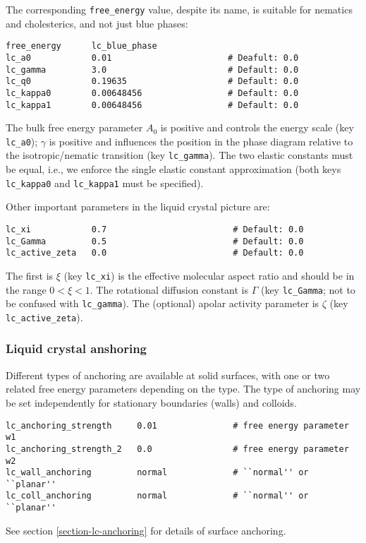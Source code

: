 The corresponding \texttt{free\_energy} value, despite its name, is
suitable for nematics and cholesterics, and not just blue phases:
\begin{lstlisting}
free_energy      lc_blue_phase
lc_a0            0.01                       # Deafult: 0.0
lc_gamma         3.0                        # Default: 0.0
lc_q0            0.19635                    # Default: 0.0
lc_kappa0        0.00648456                 # Default: 0.0
lc_kappa1        0.00648456                 # Default: 0.0
\end{lstlisting}
The bulk free energy parameter $A_0$ is positive and controls the
energy scale (key \texttt{lc\_a0}); $\gamma$ is positive and
influences the position in the phase diagram relative to the
isotropic/nematic transition (key \texttt{lc\_gamma}).
The two elastic constants must be equal, i.e., we enforce the
single elastic constant approximation (both keys \texttt{lc\_kappa0} and
\texttt{lc\_kappa1} must be specified).

Other important parameters in the liquid crystal picture are:
\begin{lstlisting}
lc_xi            0.7                         # Default: 0.0
lc_Gamma         0.5                         # Default: 0.0
lc_active_zeta   0.0                         # Default: 0.0
\end{lstlisting}
The first is $\xi$ (key \texttt{lc\_xi}) is the effective molecular
aspect ratio and should be in the range $0< \xi< 1$. The rotational
diffusion constant is $\Gamma$ (key \texttt{lc\_Gamma}; not to be
confused with \texttt{lc\_gamma}). The (optional) apolar activity
parameter is $\zeta$ (key \texttt{lc\_active\_zeta}).

\subsubsection{Liquid crystal anshoring}

Different types of anchoring are available at solid surfaces, with
one or two related free energy parameters depending on the type.
The type of anchoring may be set independently for stationary
boundaries (walls) and colloids.
\begin{lstlisting}
lc_anchoring_strength     0.01               # free energy parameter w1
lc_anchoring_strength_2   0.0                # free energy parameter w2
lc_wall_anchoring         normal             # ``normal'' or ``planar''
lc_coll_anchoring         normal             # ``normal'' or ``planar''
\end{lstlisting}
See section \ref{section-lc-anchoring} for details of surface anchoring.

